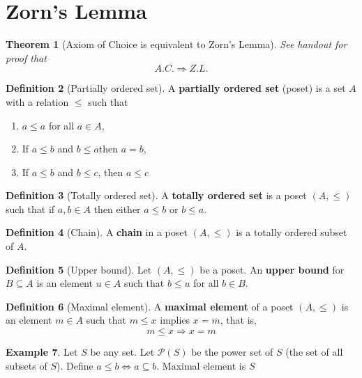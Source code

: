 \documentclass[10pt, oneside, reqno]{amsbook}
\theoremstyle{plain}%
\newtheorem{thm}{Theorem}[section]
\theoremstyle{definition}
\newtheorem{defn}[thm]{Definition}
\newtheorem{exmp}[thm]{Example}
\theoremstyle{remark}
\begin{document}

\section{Zorn's Lemma} %
\label{sec:zorn_s_lemma}

\begin{thm}[Axiom of Choice is equivalent to Zorn's Lemma]
    See handout for proof that \[
        A.C. \Rightarrow Z.L.
    \]
\end{thm}

\begin{defn}[Partially ordered set]
    A \textbf{partially ordered set} (poset) is a set $A$ with a relation $\leq$ such that 
    \begin{enumerate}[(1)]
        \item $ a \leq a$ for all $a \in A$,
        \item If $a \leq b$ and $b \leq a$then $a = b$,
        \item If $a \leq b$ and $b \leq c$, then $a \leq c$
    \end{enumerate}
\end{defn}

\begin{defn}[Totally ordered set]
    A \textbf{totally ordered set} is a poset $(A, \leq)$ such that if $a, b \in A$ then either $a \leq b$ or $b \leq a$.
\end{defn}

\begin{defn}[Chain]
    A \textbf{chain} in a poset $(A, \leq)$ is a totally ordered subset of $A$.
\end{defn}

\begin{defn}[Upper bound]
    Let $(A, \leq)$ be a poset.  An \textbf{upper bound} for $B \subseteq A$ is an element $u \in A$ such that $b \leq u$ for all $ b \in B$.  
\end{defn}

\begin{defn}[Maximal element]
    A \textbf{maximal element} of a poset $(A, \leq)$ is an element $m \in A$ such that $m \leq x$ implies $x = m$, that is, \[
        m \leq x \Rightarrow x = m
    \]
\end{defn}

\begin{exmp}
    Let $S$ be any set.  Let $\mathcal{P}(S)$ be the power set of $S$ (the set of all subsets of $S$).  Define $a \leq b \iff a \subseteq b$.  Maximal element is $S$
\end{exmp}
\end{document}
